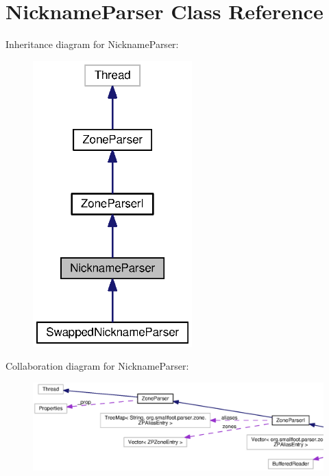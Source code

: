 \section{Nickname\+Parser Class Reference}
\label{classorg_1_1smallfoot_1_1parser_1_1zone_1_1NicknameParser}


Inheritance diagram for Nickname\+Parser\+:\nopagebreak
\begin{figure}[H]
\begin{center}
\leavevmode
\includegraphics[width=174pt]{classorg_1_1smallfoot_1_1parser_1_1zone_1_1NicknameParser__inherit__graph}
\end{center}
\end{figure}


Collaboration diagram for Nickname\+Parser\+:\nopagebreak
\begin{figure}[H]
\begin{center}
\leavevmode
\includegraphics[width=350pt]{classorg_1_1smallfoot_1_1parser_1_1zone_1_1NicknameParser__coll__graph}
\end{center}
\end{figure}
